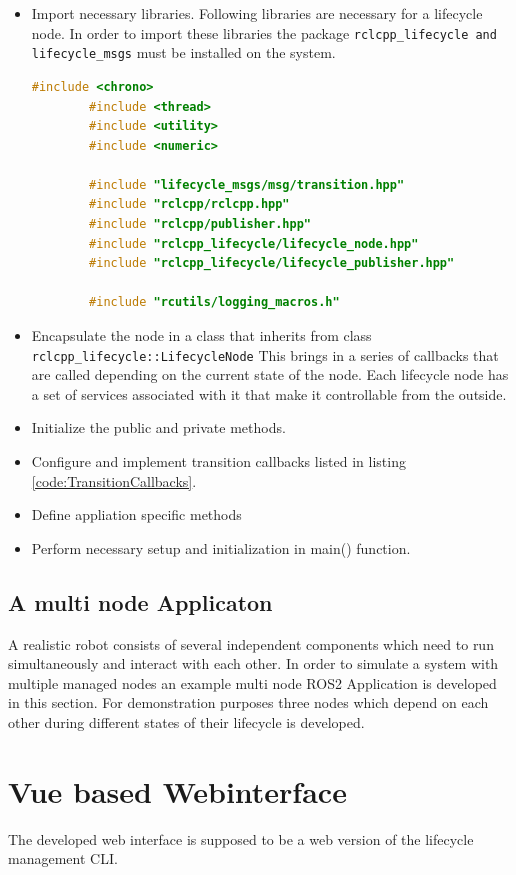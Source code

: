 \begin{itemize}
	\item Import necessary libraries. Following libraries are necessary for a lifecycle node. In order to import these libraries the package \lstinline{rclcpp_lifecycle and lifecycle_msgs} must be installed on the system. \begin{lstlisting}[language=cpp]
		#include <chrono>
		#include <thread>
		#include <utility>
		#include <numeric>

		#include "lifecycle_msgs/msg/transition.hpp"
		#include "rclcpp/rclcpp.hpp"
		#include "rclcpp/publisher.hpp"
		#include "rclcpp_lifecycle/lifecycle_node.hpp"
		#include "rclcpp_lifecycle/lifecycle_publisher.hpp"

		#include "rcutils/logging_macros.h"

	\end{lstlisting}
	\item Encapsulate the node in a class that inherits from class \lstinline{rclcpp_lifecycle::LifecycleNode} This brings in a series of callbacks that are called depending on the current state of the node. Each lifecycle node has a set of services associated with it that make it controllable from the outside.
	\item Initialize the public and private methods.
	\item Configure and implement transition callbacks listed in listing \ref{code:TransitionCallbacks}.
	\item Define appliation specific methods
	\item Perform necessary setup and initialization in main() function.  
\end{itemize}


\subsection{A multi node Applicaton}
A realistic robot consists of several independent components which need to run simultaneously and interact with each other. In order to simulate a system with multiple managed nodes an example multi node ROS2 Application is developed in this section. For demonstration purposes three nodes which depend on each other during different states of their lifecycle is developed. 

\section{Vue based Webinterface}
\label{Implementierung:VueBasedWebinterface}
The developed web interface is supposed to be a web version of the lifecycle management CLI. 

